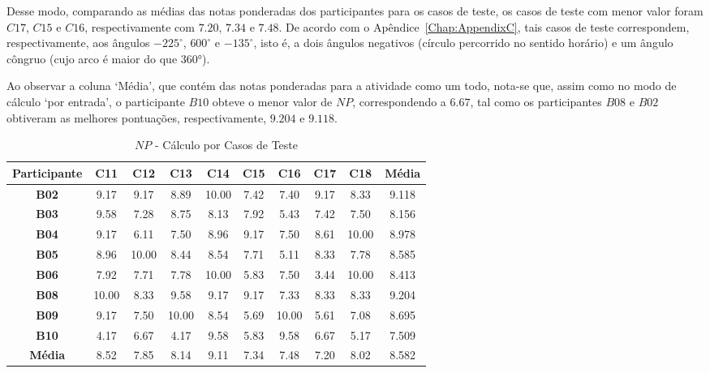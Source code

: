 Desse modo, comparando as médias das notas ponderadas dos participantes para os casos de teste, os casos de teste com menor valor foram $C17$, $C15$ e $C16$, respectivamente com $7.20$, $7.34$ e $7.48$. De acordo com o Apêndice~\ref{Chap:AppendixC}, tais casos de teste correspondem, respectivamente, aos ângulos $-225^{\circ}$, $600^{\circ}$ e $-135^{\circ}$, isto é, a dois ângulos negativos (círculo percorrido no sentido horário) e um ângulo côngruo (cujo arco é maior do que 360°).

Ao observar a coluna `Média', que contém das notas ponderadas para a atividade como um todo, nota-se que, assim como no modo de cálculo `por entrada', o participante $B10$ obteve o menor valor de $NP$, correspondendo a $6.67$, tal como os participantes $B08$ e $B02$ obtiveram as melhores pontuações, respectivamente, $9.204$ e $9.118$.

\begin{table}[htbp]
	\centering
	\caption{$NP$ - Cálculo por Casos de Teste}
	\begin{tabular}{|c|c|c|c|c|c|c|c|c|c|}
		\hline
		\rowcolor[HTML]{D9D9D9} 
		\cellcolor[HTML]{D0CECE}\textbf{Participante} & \textbf{C11} & \textbf{C12} & \textbf{C13} & \textbf{C14} & \textbf{C15} & \textbf{C16} & \textbf{C17} & \textbf{C18} & \textbf{Média} \\ \hline
		\textbf{B02} & 9.17 & 9.17 & 8.89 & 10.00 & 7.42 & 7.40 & 9.17 & 8.33 & 9.118 \\ \hline
		\rowcolor[HTML]{F2F2F2} 
		\textbf{B03} & 9.58 & 7.28 & 8.75 & 8.13 & 7.92 & 5.43 & 7.42 & 7.50 & 8.156 \\ \hline
		\textbf{B04} & 9.17 & 6.11 & 7.50 & 8.96 & 9.17 & 7.50 & 8.61 & 10.00 & 8.978 \\ \hline
		\rowcolor[HTML]{F2F2F2} 
		\textbf{B05} & 8.96 & 10.00 & 8.44 & 8.54 & 7.71 & 5.11 & 8.33 & 7.78 & 8.585 \\ \hline
		\textbf{B06} & 7.92 & 7.71 & 7.78 & 10.00 & 5.83 & 7.50 & 3.44 & 10.00 & 8.413 \\ \hline
		\rowcolor[HTML]{F2F2F2} 
		\textbf{B08} & 10.00 & 8.33 & 9.58 & 9.17 & 9.17 & 7.33 & 8.33 & 8.33 & 9.204 \\ \hline
		\textbf{B09} & 9.17 & 7.50 & 10.00 & 8.54 & 5.69 & 10.00 & 5.61 & 7.08 & 8.695 \\ \hline
		\rowcolor[HTML]{F2F2F2} 
		\textbf{B10} & 4.17 & 6.67 & 4.17 & 9.58 & 5.83 & 9.58 & 6.67 & 5.17 & 7.509 \\ \hline
		\rowcolor[HTML]{D0CECE} 
		\textbf{Média} & 8.52 & 7.85 & 8.14 & 9.11 & 7.34 & 7.48 & 7.20 & 8.02 & 8.582 \\ \hline
	\end{tabular}
	\label{tab:F3_A2_NP_CASOS_}
\end{table}


